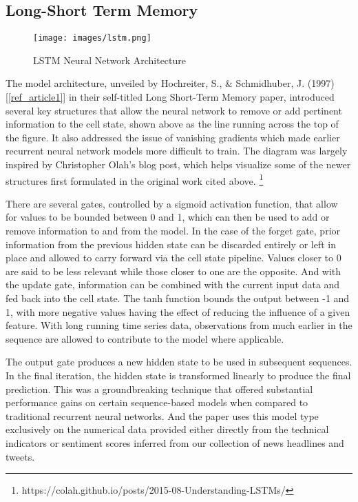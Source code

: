 \documentclass{llncs}
\begin{document}
\subsection{Long-Short Term Memory}

\begin{figure}[ht!]
    \centering
    \texttt{[image: images/lstm.png]}
    \caption{LSTM Neural Network Architecture}
    \label{fig:lstm_architecture}
    \hfill
\end{figure}

The model architecture, unveiled by Hochreiter, S., \& Schmidhuber, J. (1997) [\ref{ref_article1}] in their self-titled Long Short-Term Memory paper, introduced several key structures that allow the neural network to remove or add pertinent information to the cell state, shown above as the line running across the top of the figure.  It also addressed the issue of vanishing gradients which made earlier recurrent neural network models more difficult to train.  The diagram was largely inspired by Christopher Olah's blog post, which helps visualize some of the newer structures first formulated in the original work cited above. \footnote{https://colah.github.io/posts/2015-08-Understanding-LSTMs/}

There are several gates, controlled by a sigmoid activation function, that allow for values to be bounded between 0 and 1, which can then be used to add or remove information to and from the model.  In the case of the forget gate, prior information from the previous hidden state can be discarded entirely or left in place and allowed to carry forward via the cell state pipeline.  Values closer to 0 are said to be less relevant while those closer to one are the opposite.  And with the update gate, information can be combined with the current input data and fed back into the cell state.  The tanh function bounds the output between -1 and 1, with more negative values having the effect of reducing the influence of a given feature. With long running time series data, observations from much earlier in the sequence are allowed to contribute to the model where applicable.  

The output gate produces a new hidden state to be used in subsequent sequences.  In the final iteration, the hidden state is transformed linearly to produce the final prediction.  This was a groundbreaking technique that offered substantial performance gains on certain sequence-based models when compared to traditional recurrent neural networks.  And the paper uses this model type exclusively on the numerical data provided either directly from the technical indicators or sentiment scores inferred from our collection of news headlines and tweets.
\end{document}
